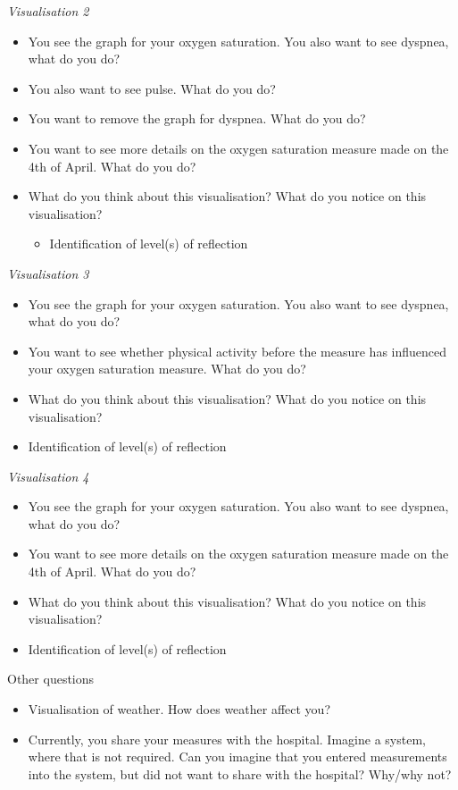 \textit{\small Visualisation 2}
\begin{itemize}
\item You see the graph for your oxygen saturation. You also want to see dyspnea, what do you do?
\item You also want to see pulse. What do you do?
\item You want to remove the graph for dyspnea. What do you do?
\item You want to see more details on the oxygen saturation measure made on the 4th of April. What do you do?
\item What do you think about this visualisation? What do you notice on this visualisation?
\begin{itemize}
	\item Identification of level(s) of reflection
	\end{itemize}
\end{itemize}

\textit{\small Visualisation 3}
\begin{itemize}
\item You see the graph for your oxygen saturation. You also want to see dyspnea, what do you do?
\item You want to see whether physical activity before the measure has influenced your oxygen saturation measure. What do you do? 
\item What do you think about this visualisation? What do you notice on this visualisation?
\item Identification of level(s) of reflection
\end{itemize}

\textit{\small Visualisation 4}
\begin{itemize}
\item You see the graph for your oxygen saturation. You also want to see dyspnea, what do you do?
\item You want to see more details on the oxygen saturation measure made on the 4th of April. What do you do?
\item What do you think about this visualisation? What do you notice on this visualisation?
\item Identification of level(s) of reflection
\end{itemize}

Other questions
\begin{itemize}
\item Visualisation of weather. How does weather affect you?
\item Currently, you share your measures with the hospital. Imagine a system, where that is not required. Can you imagine that you entered measurements into the system, but did not want to share with the hospital? Why/why not?
\end{itemize}